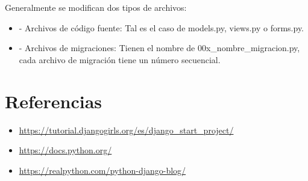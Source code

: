 \documentclass{article}
\begin{document}
\begin{itemize}
            Generalmente se modifican dos tipos de archivos:
            \begin{itemize}
                \item - Archivos de código fuente: Tal es el caso de models.py, views.py o forms.py.
                \item- Archivos de migraciones: Tienen el nombre de 00x\_nombre\_migracion.py, cada archivo de migración tiene un número secuencial. 
            \end{itemize}
	\end{itemize}	
 \section{Referencias}
	\begin{itemize}			
		\item \url{https://tutorial.djangogirls.org/es/django_start_project/}
		\item \url{https://docs.python.org/}
		\item \url{https://realpython.com/python-django-blog/}
	\end{itemize}	
			
\end{document}
